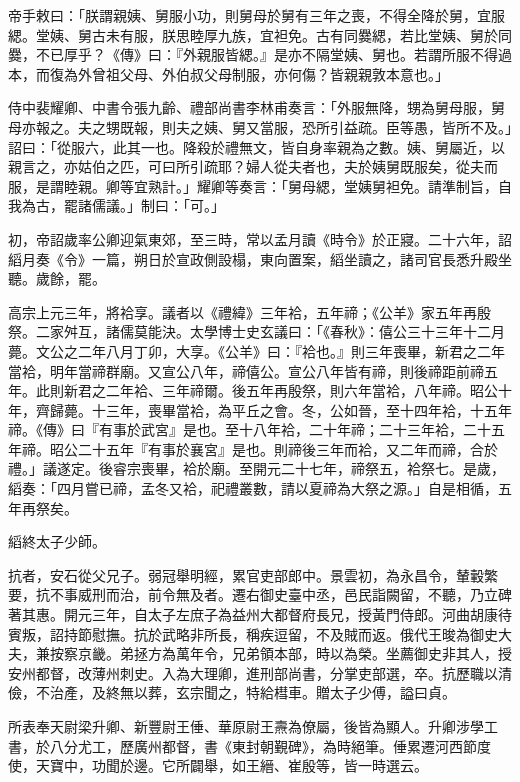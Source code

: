 \begin{pinyinscope}
 帝手敕曰：「朕謂親姨、舅服小功，則舅母於舅有三年之喪，不得全降於舅，宜服緦。堂姨、舅古未有服，朕思睦厚九族，宜袒免。古有同爨緦，若比堂姨、舅於同爨，不已厚乎？《傳》曰：『外親服皆緦。』是亦不隔堂姨、舅也。若謂所服不得過本，而復為外曾祖父母、外伯叔父母制服，亦何傷？皆親親敦本意也。」



 侍中裴耀卿、中書令張九齡、禮部尚書李林甫奏言：「外服無降，甥為舅母服，舅母亦報之。夫之甥既報，則夫之姨、舅又當服，恐所引益疏。臣等愚，皆所不及。」詔曰：「從服六，此其一也。降殺於禮無文，皆自身率親為之數。姨、舅屬近，以親言之，亦姑伯之匹，可曰所引疏耶？婦人從夫者也，夫於姨舅既服矣，從夫而服，是謂睦親。卿等宜熟計。」耀卿等奏言：「舅母緦，堂姨舅袒免。請準制旨，自我為古，罷諸儒議。」制曰：「可。」



 初，帝詔歲率公卿迎氣東郊，至三時，常以孟月讀《時令》於正寢。二十六年，詔縚月奏《令》一篇，朔日於宣政側設榻，東向置案，縚坐讀之，諸司官長悉升殿坐聽。歲餘，罷。



 高宗上元三年，將袷享。議者以《禮緯》三年袷，五年禘；《公羊》家五年再殷祭。二家舛互，諸儒莫能決。太學博士史玄議曰：「《春秋》：僖公三十三年十二月薨。文公之二年八月丁卯，大享。《公羊》曰：『袷也。』則三年喪畢，新君之二年當袷，明年當禘群廟。又宣公八年，禘僖公。宣公八年皆有禘，則後禘距前禘五年。此則新君之二年袷、三年禘爾。後五年再殷祭，則六年當袷，八年禘。昭公十年，齊歸薨。十三年，喪畢當袷，為平丘之會。冬，公如晉，至十四年袷，十五年禘。《傳》曰『有事於武宮』是也。至十八年袷，二十年禘；二十三年袷，二十五年禘。昭公二十五年『有事於襄宮』是也。則禘後三年而袷，又二年而禘，合於禮。」議遂定。後睿宗喪畢，袷於廟。至開元二十七年，禘祭五，袷祭七。是歲，縚奏：「四月嘗已禘，孟冬又袷，祀禮叢數，請以夏禘為大祭之源。」自是相循，五年再祭矣。



 縚終太子少師。



 抗者，安石從父兄子。弱冠舉明經，累官吏部郎中。景雲初，為永昌令，輦轂繁要，抗不事威刑而治，前令無及者。遷右御史臺中丞，邑民詣闕留，不聽，乃立碑著其惠。開元三年，自太子左庶子為益州大都督府長兄，授黃門侍郎。河曲胡康待賓叛，詔持節慰撫。抗於武略非所長，稱疾逗留，不及賊而返。俄代王晙為御史大夫，兼按察京畿。弟拯方為萬年令，兄弟領本部，時以為榮。坐薦御史非其人，授安州都督，改薄州刺史。入為大理卿，進刑部尚書，分掌吏部選，卒。抗歷職以清儉，不治產，及終無以葬，玄宗聞之，特給槥車。贈太子少傅，謚曰貞。



 所表奉天尉梁升卿、新豐尉王倕、華原尉王燾為僚屬，後皆為顯人。升卿涉學工書，於八分尤工，歷廣州都督，書《東封朝覲碑》，為時絕筆。倕累遷河西節度使，天寶中，功聞於邊。它所闢舉，如王縉、崔殷等，皆一時選云。




\end{pinyinscope}
